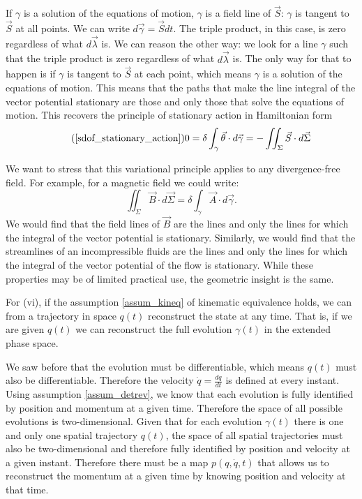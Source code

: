 \documentclass[10pt,twocolumn, nofootinbib]{revtex4-2}
\begin{document}
If $\gamma$ is a solution of the equations of motion, $\gamma$ is a field line of $\vec{S}$: $\gamma$ is tangent to $\vec{S}$ at all points. We can write $d\vec{\gamma} = \vec{S} dt$. The triple product, in this case, is zero regardless of what $d\vec{\lambda}$ is. We can reason the other way: we look for a line $\gamma$ such that the triple product is zero regardless of what $d\vec{\lambda}$ is. The only way for that to happen is if $\gamma$ is tangent to $\vec{S}$ at each point, which means $\gamma$ is a solution of the equations of motion. This means that the paths that make the line integral of the vector potential stationary are those and only those that solve the equations of motion. This recovers the principle of stationary action in Hamiltonian form
\begin{equation}
\tag*{(\ref{sdof_stationary_action})}
	0 =\delta \int_{\gamma} \vec{\theta} \cdot d\vec{\gamma} = - \iint_{\Sigma} \vec{S} \cdot d\vec{\Sigma} 
\end{equation}

We want to stress that this variational principle applies to any divergence-free field. For example, for a magnetic field we could write:
\begin{equation}
	\iint_{\Sigma} \vec{B} \cdot d\vec{\Sigma} = \delta \int_{\gamma} \vec{A} \cdot d\vec{\gamma}.
\end{equation}
We would find that the field lines of $\vec{B}$ are the lines and only the lines for which the integral of the vector potential is stationary. Similarly, we would find that the streamlines of an incompressible fluids are the lines and only the lines for which the integral of the vector potential of the flow is stationary. While these properties may be of limited practical use, the geometric insight is the same.

For (vi), if the assumption \ref{assum_kineq} of kinematic equivalence  holds, we can from a trajectory in space $q(t)$ reconstruct the state at any time. That is, if we are given $q(t)$ we can reconstruct the full evolution $\gamma(t)$ in the extended phase space.

We saw before that the evolution must be differentiable, which means $q(t)$ must also be differentiable. Therefore the velocity $\dot{q} = \frac{dq}{dt}$ is defined at every instant. Using assumption \ref{assum_detrev}, we know that each evolution is fully identified by position and momentum at a given time. Therefore the space of all possible evolutions is two-dimensional. Given that for each evolution $\gamma(t)$ there is one and only one spatial trajectory $q(t)$, the space of all spatial trajectories must also be two-dimensional and therefore fully identified by position and velocity at a given instant. Therefore there must be a map $p(q, \dot{q}, t)$ that allows us to reconstruct the momentum at a given time by knowing position and velocity at that time.
\end{document}
